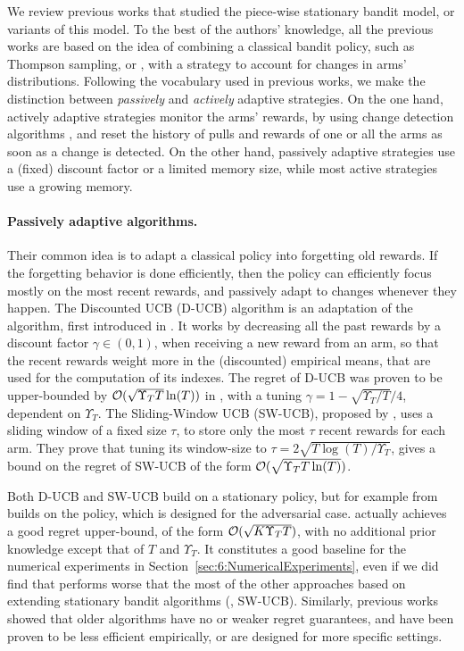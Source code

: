 We review previous works that studied the piece-wise stationary bandit model, or variants of this model.
To the best of the authors' knowledge, all the previous works are based on the idea of combining a classical bandit policy, such as Thompson sampling, \UCB{} or \ExpThree, with a strategy to account for changes in arms' distributions.
Following the vocabulary used in previous works, we make the distinction between \emph{passively} and \emph{actively} adaptive strategies.
On the one hand, actively adaptive strategies monitor the arms' rewards, by using change detection algorithms \cite{Basseville93}, and reset the history of pulls and rewards of one or all the arms as soon as a change is detected.
On the other hand, passively adaptive strategies use a (fixed) discount factor or a limited memory size, while most active strategies use a growing memory.


\paragraph{Passively adaptive algorithms.}
%
Their common idea is to adapt a classical policy into forgetting old rewards.
If the forgetting behavior is done efficiently, then the policy can efficiently focus mostly on the most recent rewards, and passively adapt to changes whenever they happen.
%
The Discounted UCB (D-UCB) algorithm is an adaptation of the \UCB{} algorithm, first introduced in \cite{Kocsis06}. It works by decreasing all the past rewards by a discount factor $\gamma\in(0,1)$, when receiving a new reward from an arm, so that the recent rewards weight more in the (discounted) empirical means, that are used for the computation of its \UCB{} indexes.
The regret of D-UCB was proven to be upper-bounded by $\mathcal{O}(\sqrt{\Upsilon_T T }\ln(T))$ in \cite{Garivier11UCBDiscount}, with a tuning $\gamma = 1 - \sqrt{\Upsilon_T/T}/4$, dependent on $\Upsilon_T$.
%
The Sliding-Window UCB (SW-UCB), proposed by \cite{Garivier11UCBDiscount}, uses a sliding window of a fixed size $\tau$, to store only the most $\tau$ recent rewards for each arm.
They prove that tuning its window-size to $\tau = 2 \sqrt{T\log(T)/\Upsilon_T}$, gives a bound on the regret of SW-UCB of the form $\mathcal{O}(\sqrt{\Upsilon_T T \ln(T)})$.

Both D-UCB and SW-UCB build on a stationary policy, but for example \ExpThreeS{} from \cite{Auer02NonStochastic}
builds on the \ExpThree{} policy, which is designed for the adversarial case.
\ExpThreeS{} actually achieves a good regret upper-bound, of the form $\mathcal{O}(\sqrt{K \Upsilon_T T})$, with no additional prior knowledge except that of $T$ and $\Upsilon_T$.
It constitutes a good baseline for the numerical experiments in Section~\ref{sec:6:NumericalExperiments},
even if we did find that \ExpThreeS{} performs worse that the most of the other approaches based on extending stationary bandit algorithms (\eg, SW-UCB).
Similarly, previous works showed that older algorithms have no or weaker regret guarantees, and have been proven to be less efficient empirically, or are designed for more specific settings.


